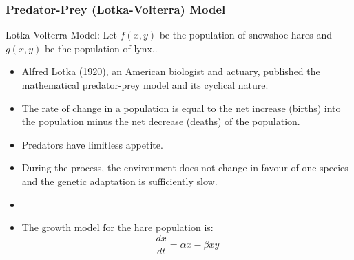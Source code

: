 







\begin{frame}
    \frametitle{Predator-Prey (Lotka-Volterra) Model}
Lotka-Volterra Model: Let $ f ( x , y ) $ be the population of snowshoe hares and $g ( x , y ) $
be the population of lynx..    
    \begin{itemize}
    \item 
     Alfred Lotka (1920), an American biologist and actuary,
published the mathematical predator-prey model and its
cyclical nature.
        \item  The rate of change in a population is equal to the net increase (births) into
the population minus the net decrease (deaths) of the population.
        \item Predators have limitless appetite.
        \item During the process, the environment does not change in favour of one species and the
genetic adaptation is sufficiently slow.
        \item 
        \item The growth model for the hare population is:
\[\frac { d x } { d t } = \alpha x - \beta x y \]
    \end{itemize} 
\end{frame}

